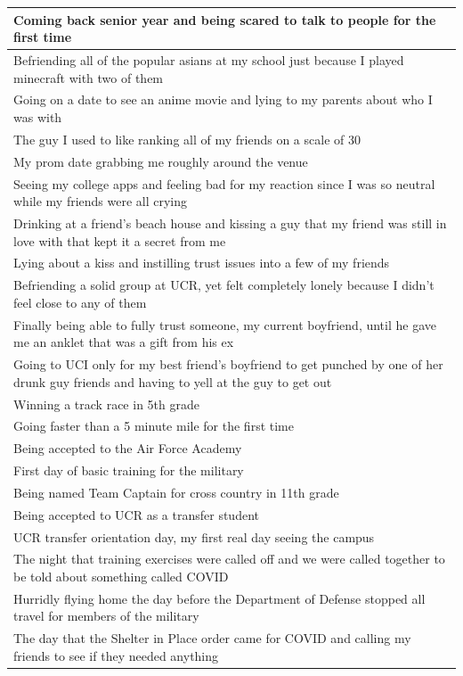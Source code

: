 \documentclass[
  .7em,
  letterpaper,
  DIV=11,
  numbers=noendperiod]{scrartcl}
\begin{document}
\begin{table}
\begin{tabular}{l}
\hline
Coming back senior year and being scared to talk to people for the first time\\
\hline
Befriending all of the popular asians at my school just because I played minecraft with two of them\\
\hline
Going on a date to see an anime movie and lying to my parents about who I was with\\
\hline
The guy I used to like ranking all of my friends on a scale of 30\\
\hline
My prom date grabbing me roughly around the venue\\
\hline
Seeing my college apps and feeling bad for my reaction since I was so neutral while my friends were all crying\\
\hline
Drinking at a friend's beach house and kissing a guy that my friend was still in love with that kept it a secret from me\\
\hline
Lying about a kiss and instilling trust issues into a few of my friends\\
\hline
Befriending a solid group at UCR, yet felt completely lonely because I didn't feel close to any of them\\
\hline
Finally being able to fully trust someone, my current boyfriend, until he gave me an anklet that was a gift from his ex\\
\hline
Going to UCI only for my best friend's boyfriend to get punched by one of her drunk guy friends and having to yell at the guy to get out\\
\hline
Winning a track race in 5th grade\\
\hline
Going faster than a 5 minute mile for the first time\\
\hline
Being accepted to the Air Force Academy\\
\hline
First day of basic training for the military\\
\hline
Being named Team Captain for cross country in 11th grade\\
\hline
Being accepted to UCR as a transfer student\\
\hline
UCR transfer orientation day, my first real day seeing the campus\\
\hline
The night that training exercises were called off and we were called together to be told about something called COVID\\
\hline
Hurridly flying home the day before the Department of Defense stopped all travel for members of the military\\
\hline
The day that the Shelter in Place order came for COVID and calling my friends to see if they needed anything\\

\end{tabular}
\end{table}
\end{document}
